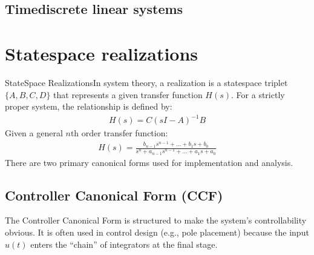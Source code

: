 \documentclass[letterpaper,10pt,english]{jupyterBook}
\begin{document}
\section{Time\sphinxhyphen{}discrete linear systems}
\label{\detokenize{ch/system-theory/controllability-reachability:time-discrete-linear-systems}}\label{\detokenize{ch/system-theory/controllability-reachability:controllability-reachability-time-discrete}}
\sphinxstepscope


\chapter{State\sphinxhyphen{}space realizations}
\label{\detokenize{ch/system-theory/realizations:state-space-realizations}}\label{\detokenize{ch/system-theory/realizations:system-theory-state-space-realizations}}\label{\detokenize{ch/system-theory/realizations::doc}}
\sphinxAtStartPar
State\sphinxhyphen{}Space RealizationsIn system theory, a realization is a state\sphinxhyphen{}space triplet \(\{A, B, C, D\}\) that represents a given transfer function \(H(s)\). For a strictly proper system, the relationship is defined by:
\begin{equation*}
\begin{split}H(s) = C(sI - A)^{-1}B\end{split}
\end{equation*}
\sphinxAtStartPar
Given a general \(n\)\sphinxhyphen{}th order transfer function:
\begin{equation*}
\begin{split}H(s) = \frac{b_{n-1}s^{n-1} + \dots + b_1s + b_0}{s^n + a_{n-1}s^{n-1} + \dots + a_1s + a_0}\end{split}
\end{equation*}
\sphinxAtStartPar
There are two primary canonical forms used for implementation and analysis.


\section{Controller Canonical Form (CCF)}
\label{\detokenize{ch/system-theory/realizations:controller-canonical-form-ccf}}\label{\detokenize{ch/system-theory/realizations:system-theory-state-space-realizations-ccf}}
\sphinxAtStartPar
The Controller Canonical Form is structured to make the system’s controllability obvious. It is often used in control design (e.g., pole placement) because the input \(u(t)\) enters the “chain” of integrators at the final stage.
\end{document}
